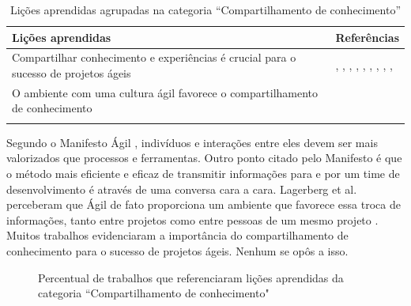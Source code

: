 \begin{table}[H]
	\centering
	\captionsetup{justification=centering}
	\begin{tabularx}{\linewidth}{ | X | p{5cm} | } \hline \textbf{Lições aprendidas} & \textbf{Referências} \\ \hline
		Compartilhar conhecimento e experiências é crucial para o sucesso de projetos ágeis & \cite{Asnawi2012}, \cite{Cisco2011}, \cite{Lapham2012}, \cite{Radha2012}, \cite{Eunha2012}, \cite{Valerio2013}, \cite{Vieira2013}, \cite{Queiroz2013}, \cite{Bastos2013}, \cite{Maciel2013} \\ \hline
		O ambiente com uma cultura ágil favorece o compartilhamento de conhecimento & \cite{Ericsson2013} \\ \hline
	\caption{Lições aprendidas agrupadas na categoria ``Compartilhamento de conhecimento''}
	\end{tabularx}
\end{table}

Segundo o Manifesto Ágil \cite{agileManifesto}, indivíduos e interações entre eles devem ser mais valorizados que processos e ferramentas. Outro ponto citado pelo Manifesto é que o método mais eficiente e eficaz de transmitir informações para e por um time de desenvolvimento é através de uma conversa cara a cara. Lagerberg et al. perceberam que Ágil de fato proporciona um ambiente que favorece essa troca de informações, tanto entre projetos como entre pessoas de um mesmo projeto \cite{Ericsson2013}. Muitos trabalhos evidenciaram a importância do compartilhamento de conhecimento para o sucesso de projetos ágeis. Nenhum se opôs a isso.

\begin{figure}[H]
	\centering
	\captionsetup{justification=centering}
	\caption{Percentual de trabalhos que referenciaram lições aprendidas da categoria ``Compartilhamento de conhecimento"}
	\label{fig:conhecimento}
\end{figure}

